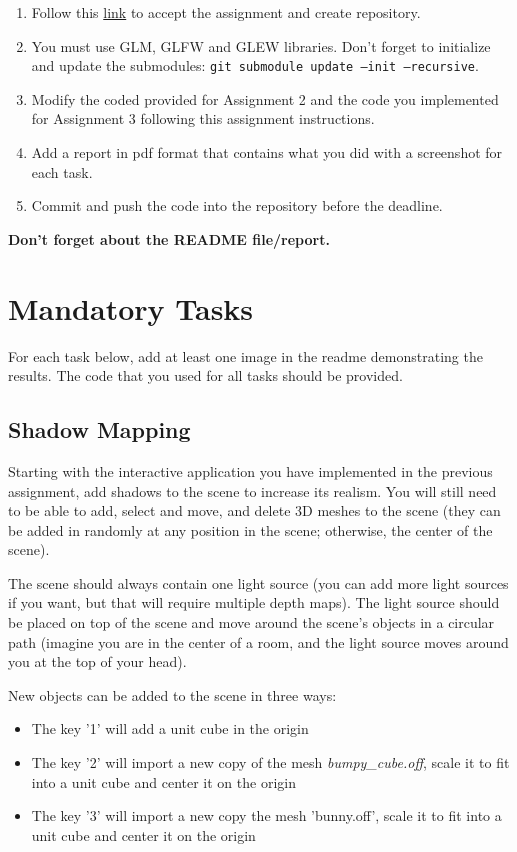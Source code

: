 \documentclass[11pt]{article}
\begin{document}

\begin{enumerate}
\item Follow this \href{https://classroom.github.com/a/Tme85rw5}{link} to accept the assignment and create repository.
\item You must use GLM, GLFW and GLEW libraries. Don't forget to initialize and update the submodules: \texttt{git submodule update --init --recursive}.
\item Modify the coded provided for Assignment 2 and the code you implemented for Assignment 3 following this assignment instructions.
\item Add a report in pdf format that contains what you did with a screenshot for each task.
\item Commit and push the code into the repository before the deadline.
\end{enumerate}

\textbf{Don't forget about the README file/report.}

\section{Mandatory Tasks}
For each task below, add at least one image in the readme demonstrating the results. The code that you used for all tasks should be provided.

\subsection{Shadow Mapping}

Starting with the interactive application you have implemented in the previous assignment, add shadows to the scene to increase its realism.
You will still need to be able to add, select and move, and delete 3D meshes to the scene (they can be added in randomly at any position in the scene; otherwise, the center of the scene).

The scene should always contain one light source (you can add more light sources if you want, but that will require multiple depth maps). The light source should be placed on top of the scene and move around the scene's objects in a circular path (imagine you are in the center of a room, and the light source moves around you at the top of your head).

New objects can be added to the scene in three ways:
\begin{itemize}
\item The key '1' will add a unit cube in the origin
\item The key '2' will import a new copy of the mesh \emph{bumpy\_cube.off}, scale it to fit into a unit cube and center it on the origin
\item The key '3' will import a new copy the mesh 'bunny.off', scale it to fit into a unit cube and center it on the origin
\end{itemize}
\end{document}
